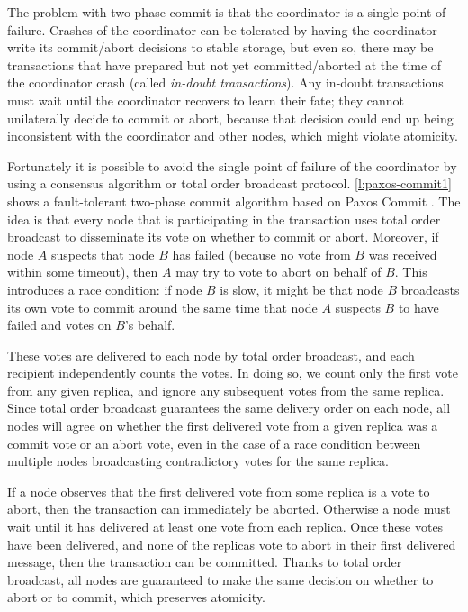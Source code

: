 The problem with two-phase commit is that the coordinator is a single point of failure.
Crashes of the coordinator can be tolerated by having the coordinator write its commit/abort decisions to stable storage, but even so, there may be transactions that have prepared but not yet committed/aborted at the time of the coordinator crash (called \emph{in-doubt transactions}).
Any in-doubt transactions must wait until the coordinator recovers to learn their fate; they cannot unilaterally decide to commit or abort, because that decision could end up being inconsistent with the coordinator and other nodes, which might violate atomicity.

Fortunately it is possible to avoid the single point of failure of the coordinator by using a consensus algorithm or total order broadcast protocol.
\autoref{l:paxos-commit1} shows a fault-tolerant two-phase commit algorithm based on Paxos Commit \citep{Gray:2006}.
The idea is that every node that is participating in the transaction uses total order broadcast to disseminate its vote on whether to commit or abort.
Moreover, if node $A$ suspects that node $B$ has failed (because no vote from $B$ was received within some timeout), then $A$ may try to vote to abort on behalf of $B$.
This introduces a race condition: if node $B$ is slow, it might be that node $B$ broadcasts its own vote to commit around the same time that node $A$ suspects $B$ to have failed and votes on $B$'s behalf.

These votes are delivered to each node by total order broadcast, and each recipient independently counts the votes.
In doing so, we count only the first vote from any given replica, and ignore any subsequent votes from the same replica.
Since total order broadcast guarantees the same delivery order on each node, all nodes will agree on whether the first delivered vote from a given replica was a commit vote or an abort vote, even in the case of a race condition between multiple nodes broadcasting contradictory votes for the same replica.

If a node observes that the first delivered vote from some replica is a vote to abort, then the transaction can immediately be aborted.
Otherwise a node must wait until it has delivered at least one vote from each replica.
Once these votes have been delivered, and none of the replicas vote to abort in their first delivered message, then the transaction can be committed.
Thanks to total order broadcast, all nodes are guaranteed to make the same decision on whether to abort or to commit, which preserves atomicity.


